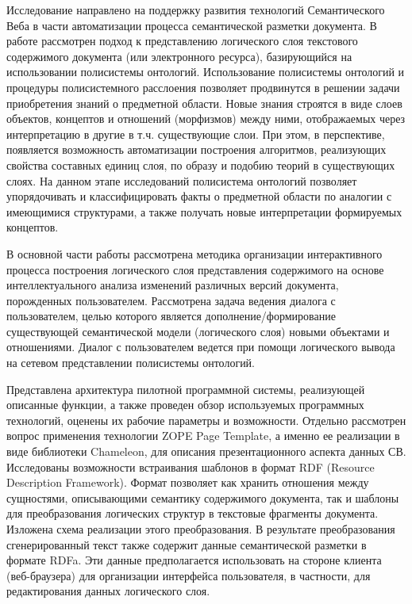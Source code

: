 \documentclass[utf8]{../IncArticle}
\newcommand{\e}[2][fcolor]{\textcolor{pcolor}{[}\textcolor{#1}{#2}\textcolor{pcolor}{]}}
\begin{document}

\conclusion


Исследование направлено на поддержку развития технологий
Семантического Веба в части автоматизации процесса семантической
разметки документа.  В работе рассмотрен подход к представлению
логического слоя текстового содержимого документа (или электронного
ресурса), базирующийся на использовании полисистемы онтологий.
Использование полисистемы онтологий и процедуры полисистемного
расслоения \cite{father} позволяет продвинутся в решении задачи
приобретения знаний о предметной области.  Новые знания строятся в
виде слоев объектов, концептов и отношений (морфизмов) между ними,
отображаемых через интерпретацию в другие в т.ч. существующие слои.
При этом, в перспективе, появляется возможность автоматизации
построения алгоритмов, реализующих свойства составных единиц слоя, по
образу и подобию теорий в существующих слоях.  На данном этапе
исследований полисистема онтологий позволяет упорядочивать и
классифицировать факты о предметной области по аналогии с имеющимися
структурами, а также получать новые интерпретации формируемых
концептов.

В основной части работы рассмотрена методика организации
интерактивного процесса построения логического слоя представления
содержимого на основе интеллектуального анализа изменений различных
версий документа, порожденных пользователем.  Рассмотрена задача
ведения диалога с пользователем, целью которого является
дополнение/формирование существующей семантической модели (логического
слоя) новыми объектами и отношениями.  Диалог с пользователем ведется
при помощи логического вывода на сетевом представлении полисистемы
онтологий.

Представлена архитектура пилотной программной системы, реализующей описанные
функции, а также проведен обзор используемых программных технологий,
оценены их рабочие параметры и возможности.  Отдельно рассмотрен
вопрос применения технологии ZOPE Page Template, а именно ее
реализации в виде библиотеки Chameleon, для описания презентационного
аспекта данных СВ.  Исследованы возможности встраивания шаблонов в
формат RDF (Resource Description Framework).  Формат позволяет как
хранить отношения между сущностями, описывающими семантику содержимого
документа, так и шаблоны для преобразования логических структур в
текстовые фрагменты документа.  Изложена схема реализации этого
преобразования.  В результате преобразования сгенерированный текст
также содержит данные семантической разметки в формате RDFa.  Эти
данные предполагается использовать на стороне клиента (веб-браузера)
для организации интерфейса пользователя, в частности, для
редактирования данных логического слоя.
\end{document}
